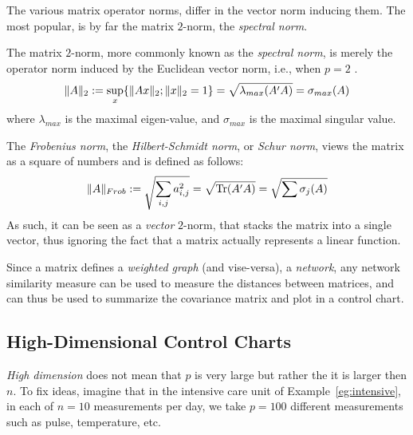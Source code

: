 The various matrix operator norms, differ in the vector norm inducing them.
The most popular, is by far the matrix $2$-norm, \aka the \emph{spectral norm}.

\begin{definition}
The matrix $2$-norm, more commonly known as the \emph{spectral norm}, is merely the operator norm induced by the Euclidean vector norm, i.e., when $p=2$ . 
\begin{align}
	\Vert A \Vert_2:= \sup_x \{ \Vert Ax \Vert_2; \Vert x \Vert_2=1 \}	= \sqrt{\lambda_{max}(A'A)} = \sigma_{max}(A)
\end{align}
where $\lambda_{max}$ is the maximal eigen-value, and $\sigma_{max}$ is the maximal singular value. 
\end{definition}



\begin{definition}
The \emph{Frobenius norm}, \aka the \emph{Hilbert-Schmidt norm}, or \emph{Schur norm}, views the matrix as a square of numbers and is defined as follows:
\begin{align}
	\Vert A \Vert_{Frob}:= \sqrt{\sum_{i,j} a_{i,j}^2} = \sqrt{\operatorname{Tr}(A'A)} = \sqrt{\sum \sigma_{j}(A)}
\end{align}
As such, it can be seen as a \emph{vector} $2$-norm, that stacks the matrix into a single vector, thus ignoring the fact that a matrix actually represents a linear function. 
\end{definition}







\begin{extra}
Since a matrix defines a \emph{weighted graph} (and vise-versa), \aka a \emph{network}, any network similarity measure can be used to measure the distances between matrices, and can thus be used to summarize the covariance matrix and plot in a control chart.
\end{extra}







\subsection{High-Dimensional Control Charts}

\emph{High dimension} does not mean that $p$ is very large but rather the it is larger then $n$.
To fix ideas, imagine that in the intensive care unit of Example~\ref{eg:intensive}, in each of $n=10$ measurements per day, we take $p=100$ different measurements such as pulse, temperature, etc.


